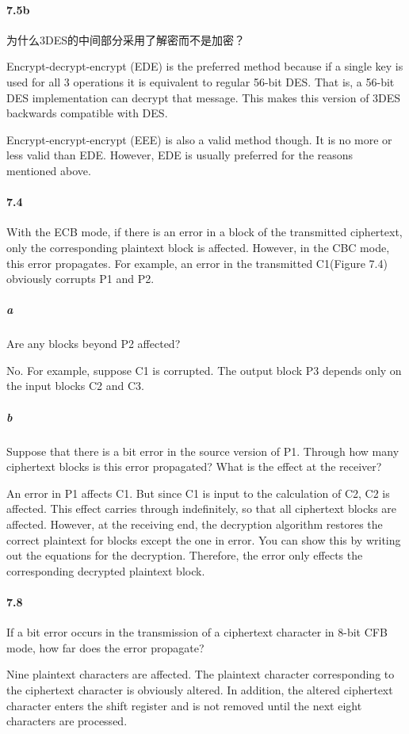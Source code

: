 \documentclass[UTF8]{article}
\begin{document}
\paragraph{7.5b}
为什么3DES的中间部分采用了解密而不是加密？

Encrypt-decrypt-encrypt (EDE) is the preferred method because if a single key is used for all 3 operations it is equivalent to regular 56-bit DES. That is, a 56-bit DES implementation can decrypt that message. This makes this version of 3DES backwards compatible with DES.

Encrypt-encrypt-encrypt (EEE) is also a valid method though. It is no more or less valid than EDE. However, EDE is usually preferred for the reasons mentioned above.
\paragraph{7.4}
With the ECB mode, if there is an error in a block of the transmitted ciphertext, only the corresponding plaintext block is affected. However, in the CBC mode, this error propagates. For example, an error in the transmitted C1(Figure 7.4) obviously corrupts P1 and P2.

\subparagraph{a}
Are any blocks beyond P2 affected?

No. For example, suppose C1 is corrupted. The output block P3 depends only on the input blocks C2 and C3.

\subparagraph{b}
Suppose that there is a bit error in the source version of P1. Through how many ciphertext blocks is this error propagated? What is the effect at the receiver?

An error in P1 affects C1. But since C1 is input to the calculation of C2, C2 is affected. This effect carries through indefinitely, so that all ciphertext blocks are affected.  However, at the receiving end, the decryption algorithm restores the correct plaintext for blocks except the one in error. You can show this by writing out the equations for the decryption. Therefore, the error only effects the corresponding decrypted plaintext block.
\paragraph{7.8}
If a bit error occurs in the transmission of a ciphertext character in 8-bit CFB mode, how far does the error propagate?

Nine plaintext characters are affected.  The plaintext character corresponding to the ciphertext character is obviously altered. In addition, the altered ciphertext character enters the shift register and is not removed until the next eight characters are processed.
\end{document}
